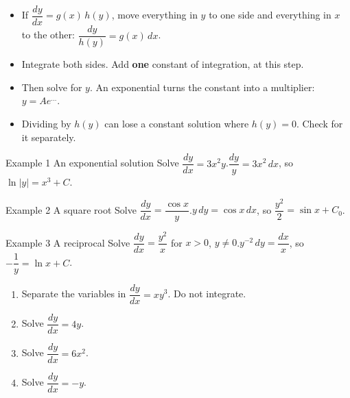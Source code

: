 \documentclass[11pt]{article}
\begin{document}

\begin{ideabox}
\begin{itemize}[leftmargin=*,itemsep=2pt,topsep=2pt]
  \item If $\dfrac{dy}{dx}=g(x)\,h(y)$, move everything in $y$ to one side and everything in $x$ to the other: $\dfrac{dy}{h(y)}=g(x)\,dx$.
  \item Integrate both sides. Add \textbf{one} constant of integration, at this step.
  \item Then solve for $y$. An exponential turns the constant into a multiplier: $y=Ae^{\ldots}$.
  \item Dividing by $h(y)$ can lose a constant solution where $h(y)=0$. Check for it separately.
\end{itemize}
\end{ideabox}

\begin{example}{Example 1 \textperiodcentered{} An exponential solution}
Solve $\dfrac{dy}{dx}=3x^2y$.\soln $\dfrac{dy}{y}=3x^2\,dx$, so $\ln|y|=x^3+C$.
\end{example}

\begin{example}{Example 2 \textperiodcentered{} A square root}
Solve $\dfrac{dy}{dx}=\dfrac{\cos x}{y}$.\soln $y\,dy=\cos x\,dx$, so $\dfrac{y^2}{2}=\sin x+C_0$.
\end{example}

\begin{example}{Example 3 \textperiodcentered{} A reciprocal}
Solve $\dfrac{dy}{dx}=\dfrac{y^2}{x}$ for $x>0$, $y\neq0$.\soln $y^{-2}\,dy=\dfrac{dx}{x}$, so $-\dfrac1y=\ln x+C$.
\end{example}

\newpage
{}

\begin{enumerate}[leftmargin=*,itemsep=2pt]
  \item Separate the variables in $\dfrac{dy}{dx}=xy^3$. Do not integrate.\work{2.3cm}
  \item Solve $\dfrac{dy}{dx}=4y$.\work{2.3cm}
  \item Solve $\dfrac{dy}{dx}=6x^2$.\work{2.3cm}
  \item Solve $\dfrac{dy}{dx}=-y$.\work{2.3cm}
\end{enumerate}
\end{document}
